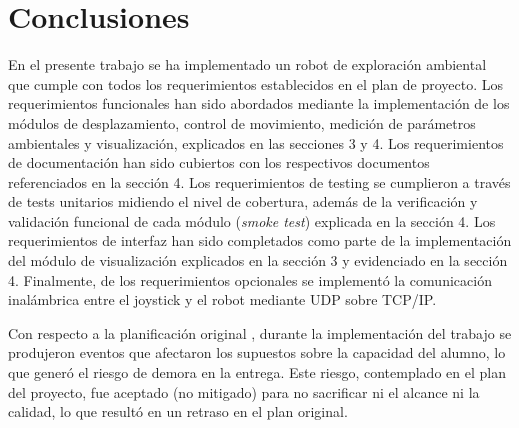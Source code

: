 
\chapter{Conclusiones} %

\label{Chapter5} %




En el presente trabajo se ha implementado un robot de exploración ambiental que cumple con todos los requerimientos establecidos en el plan de proyecto. Los requerimientos funcionales han sido abordados mediante la implementación de los módulos de desplazamiento, control de movimiento, medición de parámetros ambientales y visualización, explicados en las secciones 3 y 4. Los requerimientos de documentación han sido cubiertos con los respectivos documentos referenciados en la sección 4. Los requerimientos de testing se cumplieron a través de tests unitarios midiendo el nivel de cobertura, además de la verificación y validación funcional de cada módulo (\textit{smoke test}) explicada en la sección 4. Los requerimientos de interfaz han sido completados como parte de la implementación del módulo de visualización explicados en la sección 3 y evidenciado en la sección 4.
Finalmente, de los requerimientos opcionales se implementó la comunicación inalámbrica entre el joystick y el robot mediante UDP sobre TCP/IP.

Con respecto a la planificación original \cite{Robot_Planificacion}, durante la implementación del trabajo se produjeron eventos que afectaron los supuestos sobre la capacidad del alumno, lo que generó el riesgo de demora en la entrega. Este riesgo, contemplado en el plan del proyecto, fue aceptado (no mitigado) para no sacrificar ni el alcance ni la calidad, lo que resultó en un retraso en el plan original.


